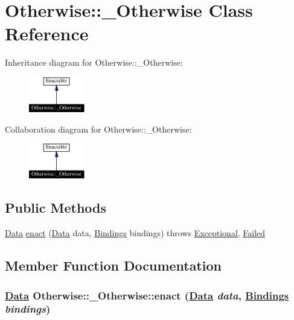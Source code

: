 \hypertarget{classOtherwise_1_1__Otherwise}{
\section{Otherwise::\_\-Otherwise  Class Reference}
\label{classOtherwise_1_1__Otherwise}
}
Inheritance diagram for Otherwise::\_\-Otherwise:\begin{figure}[H]
\begin{center}
\leavevmode
\includegraphics[width=69pt]{classOtherwise_1_1__Otherwise__inherit__graph}
\end{center}
\end{figure}
Collaboration diagram for Otherwise::\_\-Otherwise:\begin{figure}[H]
\begin{center}
\leavevmode
\includegraphics[width=69pt]{classOtherwise_1_1__Otherwise__coll__graph}
\end{center}
\end{figure}
\subsection*{Public Methods}
\begin{CompactItemize}
\item 
\hyperlink{interfaceData}{Data} \hyperlink{classOtherwise_1_1__Otherwise_a0}{enact} (\hyperlink{interfaceData}{Data} data, \hyperlink{interfaceBindings}{Bindings} bindings) throws \hyperlink{classExceptional}{Exceptional}, \hyperlink{classFailed}{Failed}
\end{CompactItemize}


\subsection{Member Function Documentation}
\hypertarget{classOtherwise_1_1__Otherwise_a0}{
\subsubsection[enact]{\setlength{\rightskip}{0pt plus 5cm}\hyperlink{interfaceData}{Data} Otherwise::\_\-Otherwise::enact (\hyperlink{interfaceData}{Data} {\em data}, \hyperlink{interfaceBindings}{Bindings} {\em bindings})}}
\label{classOtherwise_1_1__Otherwise_a0}




